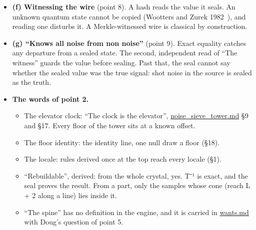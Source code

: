 \begin{itemize}
\begin{itemize}
\item An exact pair is an exact complex amplitude when the pair is (re, im), as Gaussian rationals. A (magnitude, phase) pair is exact only with the phase an index k of a root of unity, ζ\_\allowbreak{}N\textasciicircum{}k in ℤ[ζ\_\allowbreak{}N].
\item The knf as phase is untested, and it is carried in \hyperref[chap:wants]{wants.md}.
\item An exact classical register holds a qubit's state vector exactly. \texttt{ask\_\allowbreak{}state} (M21) carries a qubit exactly now. n qubits cost 2ⁿ amplitudes, and exact classical registers give no Bell violation between separated parts. “Classic qubit” fits the reading of an exact simulation with no rounding.
\end{itemize}
\item \textbf{(f) Witnessing the wire} (point 8). A hash reads the value it seals. An unknown quantum state cannot be copied (Wootters and Zurek 1982~\cite{src:Wootters-and-Zurek-1982}), and reading one disturbs it. A Merkle-witnessed wire is classical by construction.
\item \textbf{(g) “Knows all noise from non noise”} (point 9). Exact equality catches any departure from a sealed state. The second, independent read of “The witness” guards the value before sealing. Past that, the seal cannot say whether the sealed value was the true signal: shot noise in the source is sealed as the truth.
\item \textbf{The words of point 2.}

\begin{itemize}
\item The elevator clock: “The clock is the elevator”, \hyperref[chap:noise-sieve-tower]{noise\_\allowbreak{}sieve\_\allowbreak{}tower.md} §9 and §17. Every floor of the tower sits at a known offset.
\item The floor identity: the identity line, one null draw a floor (§18).
\item The locale: rules derived once at the top reach every locale (§1).
\item “Rebuildable”, derived: from the whole crystal, yes. T⁻¹ is exact, and the seal proves the result. From a part, only the samples whose cone (reach L + 2 along a line) lies inside it.
\item “The spine” has no definition in the engine, and it is carried in \hyperref[chap:wants]{wants.md} with Doug's question of point 5.
\end{itemize}
\end{itemize}

